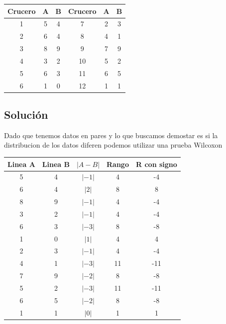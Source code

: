 \documentclass{article}
\begin{document}
\begin{center}
    \begin{tabular}{c c c |c c c}
        Crucero & A & B & Crucero & A & B \\
        \hline
        1       & 5 & 4 & 7       & 2 & 3 \\
        2       & 6 & 4 & 8       & 4 & 1 \\
        3       & 8 & 9 & 9       & 7 & 9 \\
        4       & 3 & 2 & 10      & 5 & 2 \\
        5       & 6 & 3 & 11      & 6 & 5 \\
        6       & 1 & 0 & 12      & 1 & 1 \\
    \end{tabular}
\end{center}

\subsection*{Solución}
Dado que tenemos datos en pares y lo que buscamos demostar es si la distribucion de los datos diferen podemos utilizar una prueba Wilcoxon

\begin{center}
    \begin{tabular}{c c c c c}
        Linea A & Linea B & $| A - B|$ & Rango & R con signo \\
        \hline
        5       & 4       & $|-1|$     & 4     & -4          \\
        6       & 4       & $|2|$      & 8     & 8           \\
        8       & 9       & $|-1|$     & 4     & -4          \\
        3       & 2       & $|-1|$     & 4     & -4          \\
        6       & 3       & $|-3|$     & 8     & -8          \\
        1       & 0       & $|1|$      & 4     & 4           \\
        2       & 3       & $|-1|$     & 4     & -4          \\
        4       & 1       & $|-3|$     & 11    & -11         \\
        7       & 9       & $|-2|$     & 8     & -8          \\
        5       & 2       & $|-3|$     & 11    & -11         \\
        6       & 5       & $|-2|$     & 8     & -8          \\
        1       & 1       & $|0|$      & 1     & 1           \\
    \end{tabular}
\end{center}
\end{document}
